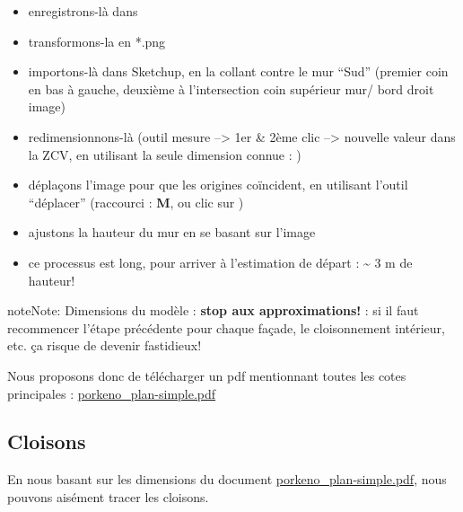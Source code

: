 \documentclass[a4paper,12pt,french]{sphinxmanual}
\begin{document}
\begin{enumerate}
\begin{itemize}
\begin{description}
\begin{itemize}
\item {} 
enregistrons-là dans 

\item {} 
transformons-la en *.png

\item {} 
importons-là dans Sketchup, en la collant contre le mur ``Sud'' (premier coin en bas à gauche, deuxième à l'intersection coin supérieur mur/ bord droit image)

\item {} 
redimensionnons-là (outil mesure --\textgreater{} 1er \& 2ème clic --\textgreater{} nouvelle valeur dans la ZCV, en utilisant la seule dimension connue : )

\item {} 
déplaçons l'image pour que les origines coïncident, en utilisant l'outil ``déplacer'' (raccourci : \textbf{M}, ou clic sur )

\item {} 
ajustons la hauteur du mur en se basant sur l'image

\item {} 
ce processus est long, pour arriver à l'estimation de départ : \textasciitilde{} 3 m de hauteur!

\end{itemize}

\end{description}

\end{itemize}

\end{enumerate}

\begin{notice}{note}{Note:}
Dimensions du modèle : \textbf{stop aux approximations!} : si il faut recommencer l'étape précédente pour chaque façade, le cloisonnement intérieur, etc. ça risque de devenir fastidieux!

Nous proposons donc de télécharger un pdf mentionnant toutes les cotes principales : \href{http://www.canopee.org/fichiers/teb-d/aides/acad/init\_su+acad/dessins/pdf/porkeno\_plans-simples\_o.turlier\_03juin09\_09h00.pdf}{porkeno\_plan-simple.pdf}
\end{notice}


\subsection{Cloisons}
\label{init_su+acad/003_su1:cloisons}\label{init_su+acad/003_su1:porkeno-plans-simples}
En nous basant sur les dimensions du document \href{http://www.canopee.org/init\_su+acad/fichiers/porkeno\_plans-simples\_o.turlier\_03juin09\_09h00.pdf}{porkeno\_plan-simple.pdf}, nous pouvons aisément tracer les cloisons.
\end{document}
